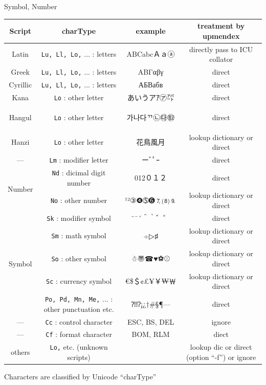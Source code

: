 \documentclass[aspectratio=169,10pt]{beamer}
\newcommand{\colBl}{\color{blue}}
\begin{document}
\begin{frame}{Symbol, Number}

\begin{center}
\scriptsize
\begin{tabular}{c|cc|c}
Script     & charType & example & treatment by upmendex \\\hline\hline
Latin      & \texttt{\colBl Lu, Ll, Lo,} ... : letters & ABCabcＡａⓐ & directly pass to ICU collator \\
Greek      & \texttt{\colBl Lu, Ll, Lo,} ... : letters & ΑΒΓαβγ & direct \\
Cyrillic   & \texttt{\colBl Lu, Ll, Lo,} ... : letters & АБВабв  & direct \\
Kana       & \texttt{\colBl Lo} : other letter & あいうアｱ㋐㌀ & direct \\
Hangul     & \texttt{\colBl Lo} : other letter & \begin{korean}가나다ᄁ㉡㉰㉼\end{korean} & direct \\
Hanzi      & \texttt{\colBl Lo} : other letter & 花鳥風月 & lookup dictionary or direct \\
---        & \texttt{\colBl Lm} : modifier letter   & ーﾞﾟｰ & direct \\\hline
\multirow{2}{*}{Number}  & \texttt{\colBl Nd} : dicimal digit number & 012０１２ & direct \\
           & \texttt{\colBl No}      : other number & ¹²③❹➄➏🄈⑻⒐ & lookup dictionary or direct \\\hline
\multirow{5}{*}{Symbol}  & \texttt{\colBl Sk} : modifier symbol   & ¨¯´＾｀゛゜& direct \\
           & \texttt{\colBl Sm} : math symbol       & ÷▷♯ & lookup dictionary or direct \\
           & \texttt{\colBl So}               : other symbol      & ☃〠☎♥⚽⚾ & lookup dictionary or direct \\
           & \texttt{\colBl Sc}               : currency symbol   & €\$＄¢£¥￥₩￦ & lookup dictionary or direct \\
           & \texttt{\colBl Po, Pd, Mn, Me,} ... : other punctuation etc. & ⁈⁉¡¿†\#§¶— & direct \\\hline
---        & \texttt{\colBl Cc}                 : control character & ESC, BS, DEL & ignore \\
---        & \texttt{\colBl Cf}                 : format character  & BOM, RLM & diect \\
others     & \texttt{\colBl Lo,} etc. (unknown scripts)             &  & lookup dic or direct (option ``-f'') or ignore \\\hline
\end{tabular}
\end{center}
\begin{center}
Characters are classified by Unicode ``charType''
\end{center}

\end{frame}
\end{document}
